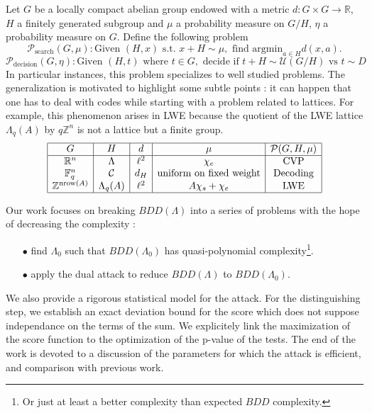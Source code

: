 \documentclass{article}
\begin{document}
Let $G$ be a locally compact abelian group endowed with a metric $d : G\times G \rightarrow \mathbb R$, $H$ a finitely generated subgroup and $\mu$ a probability measure on $G/H$, $\eta$ a probability measure on $G$. Define the following problem
$$\mathcal P_{\text{search}} (G,\mu) : \text{Given } (H,x) \text{ s.t. }x+H \sim \mu , \text{ find argmin}_{a\in H} d(x,a).$$
$$\mathcal P_{\text{decision}}(G,\eta) : \text{Given } (H,t) \text{ where } t\in G, \text{ decide if } t + H \sim \mathcal U(G/H) \text{ vs } t\sim D$$
In particular instances, this problem specializes to well studied problems. The generalization is motivated to highlight some subtle points : it can happen that one has to deal with codes while starting with a problem related to lattices. For example, this phenomenon arises in LWE because the quotient of the LWE lattice $\Lambda_q(A)$ by $q\mathbb Z^n$ is not a lattice but a finite group. 
\[\begin{array}{|c|c|c| c | c|} 
\hline
G             & H                          & d     &  \mu              & \mathcal P (G,H,\mu)\\
\hline
\mathbb R^n   & \Lambda                    & \ell^2 & \chi_e            & \text{CVP}     \\
\mathbb F_q^n & \mathcal C                 & d_H    & \text{uniform on fixed weight}    & \text{Decoding}\\
\mathbb Z^{\text{nrow}(A)}  & \Lambda_q(A) & \ell^2 &  A \chi_s +\chi_e & \text{LWE}     \\
\hline
\end{array}\]

Our work focuses on breaking $BDD(\Lambda)$ into a series of problems with the hope of decreasing the complexity :
\begin{itemize}
\item[$\bullet$] find $\Lambda_0$ such that $BDD(\Lambda_0)$ has quasi-polynomial complexity\footnote{Or just at least a better complexity than expected $BDD$ complexity.}.
\item[$\bullet$] apply the dual attack to reduce $BDD(\Lambda)$ to $BDD(\Lambda_0)$. 
\end{itemize} 

We also provide a rigorous statistical model for the attack. For the distinguishing step, we establish an exact deviation bound for the score which does not suppose independance on the terms of the sum. We explicitely link the maximization of the score function to the optimization of the p-value of the tests. The end of the work is devoted to a discussion of the parameters for which the attack is efficient, and comparison with previous work. 
\end{document}
